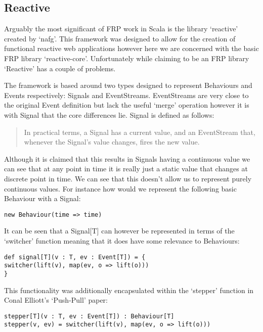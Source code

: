     \subsection{Reactive}
      Arguably the most significant of FRP work in Scala is the library `reactive' created by `nafg'. This framework was 
      designed to allow for the creation of functional reactive web applications however here we are concerned with
      the basic FRP library `reactive-core'. Unfortunately while claiming to be an FRP library `Reactive'
      has a couple of problems.
      
      The framework is based around two types designed to represent Behaviours and Events respectively: Signals
      and EventStreams. EventStreams are very close to the original Event definition but lack the
      useful `merge' operation however it is with Signal that the core differences lie. Signal is defined as follows:
      
      \begin{quote}
        In practical terms, a Signal has a current value, and an EventStream that, whenever the Signal's value changes,     
        fires the new value.
      \end{quote}  
      
      Although it is claimed that this results in Signals having a continuous value we can see
      that at any point in time it is really just a static value that changes at discrete point in
      time. We can see that this doesn't allow us to represent purely continuous values. For instance
      how would we represent the following basic Behaviour with a Signal:
      
\begin{verbatim}
new Behaviour(time => time)
\end{verbatim}

      It can be seen that a Signal[T] can however be represented in terms
      of the `switcher' function meaning that it does have some relevance to Behaviours:
      
\begin{verbatim}
def signal[T](v : T, ev : Event[T]) = {
switcher(lift(v), map(ev, o => lift(o)))
}
\end{verbatim}  

      This functionality was additionally encapsulated within the `stepper' function in Conal Elliott's
      `Push-Pull' paper:

\begin{verbatim}
stepper[T](v : T, ev : Event[T]) : Behaviour[T]
stepper(v, ev) = switcher(lift(v), map(ev, o => lift(o)))
\end{verbatim} 

